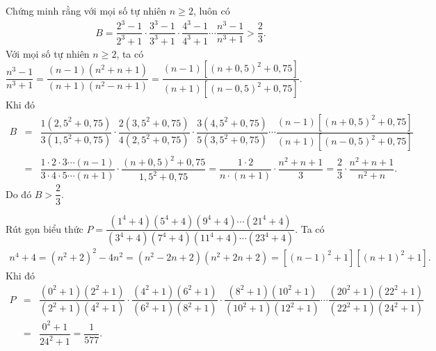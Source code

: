 \begin{bt}%
 Chứng minh rằng với mọi số tự nhiên $n \geq 2$, luôn có
 \begin{eqnarray*}
  B=\dfrac{2^3-1}{2^3+1} \cdot \dfrac{3^3-1}{3^3+1} \cdot \dfrac{4^3-1}{4^3+1} \cdots \dfrac{n^3-1}{n^3+1} > \dfrac{2}{3}.
 \end{eqnarray*}
 \loigiai
  {
  Với mọi số tự nhiên $n \geq 2$, ta có $\dfrac{n^3-1}{n^3+1} = \dfrac{(n-1)(n^2+n+1)}{(n+1)(n^2-n+1)} = \dfrac{(n-1)\left[(n+0{,}5)^2 + 0{,}75\right]}{(n+1)\left[(n-0{,}5)^2+0{,}75\right]}$.\\
  Khi đó
  \allowdisplaybreaks
  \begin{eqnarray*}
   B &=& \dfrac{1(2{,}5^2+0{,}75)}{3(1{,}5^2+0{,}75)} \cdot \dfrac{2(3{,}5^2+0{,}75)}{4(2{,}5^2+0{,75})} \cdot \dfrac{3(4{,}5^2+0{,}75)}{5(3{,}5^2+0{,}75)} \cdots \dfrac{(n-1)\left[(n+0{,}5)^2 + 0{,}75\right]}{(n+1)\left[(n-0{,}5)^2+0{,}75\right]}\\
   &=& \dfrac{1 \cdot 2 \cdot 3 \cdots (n-1)}{3 \cdot 4 \cdot 5 \cdots (n+1)} \cdot \dfrac{(n+0{,}5)^2+0{,}75}{1{,}5^2+0{,}75} = \dfrac{1 \cdot 2}{n \cdot (n+1)} \cdot \dfrac{n^2+n+1}{3} = \dfrac{2}{3} \cdot \dfrac{n^2+n+1}{n^2+n}.
  \end{eqnarray*}
  Do đó $B > \dfrac{2}{3}$.
  }
\end{bt}

\begin{bt}%
 Rút gọn biểu thức $P=\dfrac{\left(1^4+4\right) \left(5^4+4\right) \left(9^4+4\right) \cdots \left(21^4+4\right)}{\left(3^4+4\right) \left(7^4+4\right) \left(11^4+4\right) \cdots \left(23^4+4\right)}$.
 \loigiai
  {
  Ta có
  \begin{eqnarray*}
   n^4+4 = (n^2+2)^2-4n^2 = (n^2-2n+2)(n^2+2n+2)= \left[(n-1)^2+1\right]\left[(n+1)^2+1\right].
  \end{eqnarray*}
  Khi đó
  \allowdisplaybreaks
  \begin{eqnarray*}
   P &=& \dfrac{(0^2+1)(2^2+1)}{(2^2+1)(4^2+1)} \cdot \dfrac{(4^2+1)(6^2+1)}{(6^2+1)(8^2+1)} \cdot \dfrac{(8^2+1)(10^2+1)}{(10^2+1)(12^2+1)} \cdots \dfrac{(20^2+1)(22^2+1)}{(22^2+1)(24^2+1)}\\
   &=& \dfrac{0^2+1}{24^2+1} = \dfrac{1}{577}.
  \end{eqnarray*}
  }
\end{bt}


